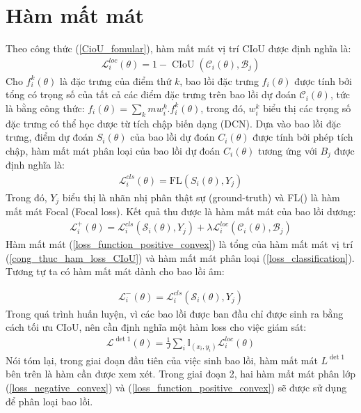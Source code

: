 \documentclass[12pt,a4paper,openany,oneside]{report}
\begin{document}
\section{Hàm mất mát}
Theo công thức (\ref{CioU_fomular}), hàm mất mát vị trí CIoU được định nghĩa là:
\begin{align} \label{cong_thuc_ham_loss_CIoU}
	\mathcal{L}_i^{l o c}(\theta)=1-\operatorname{CIoU}\left(\mathcal{C}_i(\theta), \mathcal{B}_j\right)
\end{align}
Cho $f_i^{k}(\theta)$ là đặc trưng của điểm thứ $k$, bao lồi đặc trưng $f_i(\theta)$ được tính bởi tổng có trọng số của tất cả các điểm đặc trưng trên bao lồi dự đoán $\mathcal{C}_i(\theta)$, tức là bằng công thức: $f_i(\theta) = \sum_{k}m w_i^k.f_i^k(\theta)$, trong đó, $w_i^k$ biểu thị các trọng số đặc trưng có thể học được từ tích chập biến dạng (DCN). Dựa vào bao lồi đặc trưng, điểm dự đoán $S_i(\theta)$ của bao lồi dự đoán $C_i(\theta)$ được tính bởi phép tích chập, hàm mất mát phân loại của bao lồi dự đoán $C_i(\theta)$ tương ứng với $B_j$ được định nghĩa là:
\begin{align} \label{loss_classification}
	\mathcal{L}_i^{c l s}(\theta)=\mathrm{FL}\left(S_i(\theta), Y_j\right)
\end{align}
Trong đó, $Y_j$ biểu thị là nhãn nhị phân thật sự (ground-truth) và FL() là hàm mất mát Focal (Focal loss). Kết quả thu được là hàm mất mát của bao lồi dương: 
\begin{align} \label{loss_function_positive_convex}
	\mathcal{L}_i^{+}(\theta)=\mathcal{L}_i^{c l s}\left(\mathcal{S}_i(\theta), Y_j\right)+\lambda \mathcal{L}_i^{l o c}\left(\mathcal{C}_i(\theta), \mathcal{B}_j\right)
\end{align}
Hàm mất mát (\ref{loss_function_positive_convex}) là tổng của hàm mất mát vị trí (\ref{cong_thuc_ham_loss_CIoU}) và hàm mất mát phân loại (\ref{loss_classification}). Tương tự ta có hàm mất mát dành cho bao lồi âm:

\begin{align} \label{loss_negative_convex}
	\mathcal{L}_i^{-}(\theta)=\mathcal{L}_i^{c l s}\left(\mathcal{S}_i(\theta), Y_j\right)
\end{align}
Trong quá trình huấn luyện, vì các bao lồi được ban đầu chỉ được sinh ra bằng cách tối ưu CIoU, nên cần định nghĩa một hàm loss cho việc giám sát:
\begin{align} \label{loss_det_1}
	\mathcal{L}^{\operatorname{det} 1}(\theta)=\frac{1}{J} \sum_i \mathbb{I}_{\left(x_i, y_i\right)} \mathcal{L}_i^{l o c}(\theta)
\end{align}
Nói tóm lại, trong giai đoạn đầu tiên của việc sinh bao lồi, hàm mất mát $L^{\operatorname{det} 1}$ bên trên là hàm cần được xem xét. Trong giai đoạn 2, hai hàm mất mát phân lớp (\ref{loss_negative_convex}) và (\ref{loss_function_positive_convex}) sẽ được sử dụng để phân loại bao lồi.
\end{document}
